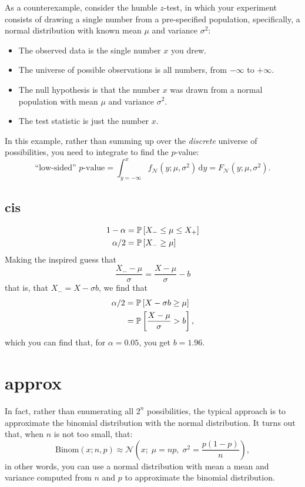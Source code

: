 As a counterexample, consider the humble $z$-test, in which your experiment consists of drawing a single number from a pre-specified population, specifically, a normal distribution with known mean $\mu$ and variance $\sigma^2$:
\begin{itemize}
\item The observed data is the single number $x$ you drew.
\item The universe of possible observations is all numbers, from $-\infty$ to $+\infty$.
\item The null hypothesis is that the number $x$ was drawn from a normal population with mean $\mu$ and variance $\sigma^2$.
\item The test statistic is just the number $x$.
\end{itemize}

In this example, rather than summing up over the \emph{discrete} universe of possibilities, you need to integrate to find the $p$-value:
\begin{equation}
  \text{``low-sided'' $p$-value} = \int_{y=-\infty}^x f_\mathcal{N}(y; \mu, \sigma^2) \,\mathrm{d}y = F_\mathcal{N}(y; \mu, \sigma^2).
\end{equation}

\subsection{cis}

\begin{align}
1 - \alpha &= \mathbb{P}\left[{X_- \leq \mu \leq X_+}\right] \\
\alpha / 2 &= \mathbb{P}\left[{X_- \geq \mu}\right]
\end{align}
Making the inspired guess that
\begin{equation}
  \frac{X_- - \mu}{\sigma} = \frac{X - \mu}{\sigma} - b
\end{equation}
that is, that $X_- = X - \sigma b$, we find that
\begin{align}
  \alpha/2 &= \mathbb{P}\left[{X - \sigma b \geq \mu}\right] \\
  &= \mathbb{P}\left[{\frac{X - \mu}{\sigma} > b}\right],
\end{align}
which you can find that, for $\alpha = 0.05$, you get $b = 1.96$.


\section{approx}

In fact, rather than enumerating all $2^n$ possibilities, the typical approach
is to approximate the binomial distribution with the normal distribution. It turns out that, when $n$ is not too small, that:
\begin{equation}
    \mathrm{Binom}(x; n, p) \approx \mathcal{N}\left(x; \; \mu = np, \; \sigma^2 = \frac{p (1-p)}{n}\right),
\end{equation}
in other words, you can use a normal distribution with mean a mean and variance
computed from $n$ and $p$ to approximate the binomial distribution.

